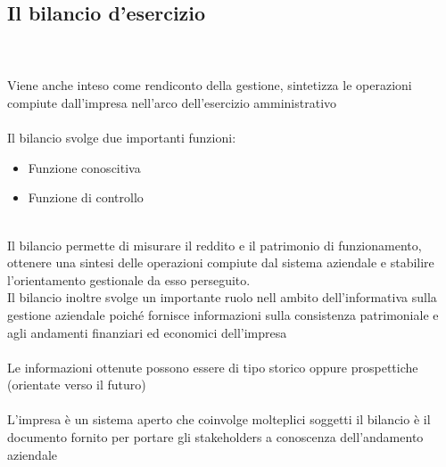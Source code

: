 \documentclass{report}
\begin{document}
\subsection{Il bilancio d'esercizio} %
\label{sub:Il bilancio d'esercizio}
\\
\\
Viene anche inteso come rendiconto della gestione, sintetizza le operazioni compiute dall'impresa nell'arco dell'esercizio amministrativo
\\
\\
Il bilancio svolge due importanti funzioni:
\\
\begin{itemize}
  \item{Funzione conoscitiva}
  \item{Funzione di controllo}
\end{itemize}
\\
Il bilancio permette di misurare il reddito e il patrimonio di funzionamento, ottenere una sintesi delle operazioni compiute dal sistema aziendale e stabilire l'orientamento gestionale da esso perseguito.
\\
Il bilancio inoltre svolge un importante ruolo nell ambito dell'informativa sulla gestione aziendale poiché fornisce informazioni sulla consistenza patrimoniale e agli andamenti finanziari ed economici dell'impresa
\\
\\
Le informazioni ottenute possono essere di tipo storico oppure prospettiche (orientate verso il futuro)
\\
\\
L'impresa è un sistema aperto che coinvolge molteplici soggetti il bilancio è il documento fornito per portare gli stakeholders a conoscenza dell'andamento aziendale 
\end{document}
